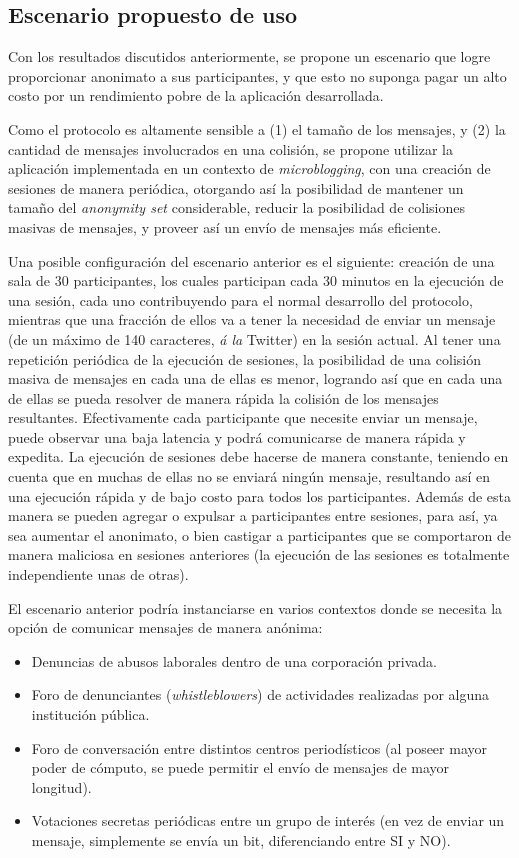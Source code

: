 \subsection{Escenario propuesto de uso}

Con los resultados discutidos anteriormente, se propone un escenario que logre 
proporcionar anonimato a sus participantes, y que esto no suponga pagar un 
alto costo por un rendimiento pobre de la aplicación desarrollada.

Como el protocolo es altamente sensible a (1) el tamaño de los mensajes, y (2) 
la cantidad de mensajes involucrados en una colisión, se propone utilizar la 
aplicación implementada en un contexto de \emph{microblogging}, con una 
creación de sesiones de manera periódica, otorgando así la posibilidad de 
mantener un tamaño del \emph{anonymity set} considerable, reducir la 
posibilidad de colisiones masivas de mensajes, y proveer así un envío de 
mensajes más eficiente.

Una posible configuración del escenario anterior es el siguiente: creación de 
una sala de 30 participantes, los cuales participan cada 30 minutos en la 
ejecución de una sesión, cada uno contribuyendo para el normal desarrollo del 
protocolo, mientras que una fracción de ellos va a tener la necesidad de 
enviar un mensaje (de un máximo de 140 caracteres, \emph{á la} Twitter) en la 
sesión actual. Al tener una repetición periódica de la ejecución de sesiones, 
la posibilidad de una colisión masiva de mensajes en cada una de ellas es 
menor, logrando así que en cada una de ellas se pueda resolver de manera rápida la 
colisión de los mensajes resultantes. Efectivamente cada participante que 
necesite enviar un mensaje, puede observar una baja latencia y podrá 
comunicarse de manera rápida y expedita. La ejecución de sesiones 
debe hacerse de manera constante, teniendo en cuenta que en muchas de ellas no se 
enviará ningún mensaje, resultando así en una ejecución rápida y de bajo costo 
para todos los participantes. Además de esta manera se pueden agregar o 
expulsar a participantes entre sesiones, para así, ya sea aumentar el 
anonimato, o bien castigar a participantes que se comportaron de manera 
maliciosa en sesiones anteriores (la ejecución de las sesiones es totalmente 
independiente unas de otras).

El escenario anterior podría instanciarse en varios contextos donde se 
necesita la opción de comunicar mensajes de manera anónima:
\begin{itemize}
	\item Denuncias de abusos laborales dentro de una corporación privada.
	\item Foro de denunciantes (\emph{whistleblowers}) de actividades 
	realizadas por alguna institución pública.
	\item Foro de conversación entre distintos centros periodísticos (al 
	poseer mayor poder de cómputo, se puede permitir el envío de mensajes de 
	mayor longitud).
	\item Votaciones secretas periódicas entre un grupo de interés (en vez de 
	enviar un mensaje, 
	simplemente se envía un bit, diferenciando entre SI y NO).
\end{itemize} 